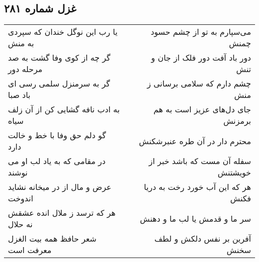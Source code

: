 \begin{center}
\section*{غزل شماره ۲۸۱}
\label{sec:sh281}
\begin{longtable}{l p{0.5cm} r}
یا رب این نوگل خندان که سپردی به منش
&&
می‌سپارم به تو از چشم حسود چمنش
\\
گر چه از کوی وفا گشت به صد مرحله دور
&&
دور باد آفت دور فلک از جان و تنش
\\
گر به سرمنزل سلمی رسی ای باد صبا
&&
چشم دارم که سلامی برسانی ز منش
\\
به ادب نافه گشایی کن از آن زلف سیاه
&&
جای دل‌های عزیز است به هم برمزنش
\\
گو دلم حق وفا با خط و خالت دارد
&&
محترم دار در آن طره عنبرشکنش
\\
در مقامی که به یاد لب او می نوشند
&&
سفله آن مست که باشد خبر از خویشتنش
\\
عرض و مال از در میخانه نشاید اندوخت
&&
هر که این آب خورد رخت به دریا فکنش
\\
هر که ترسد ز ملال انده عشقش نه حلال
&&
سر ما و قدمش یا لب ما و دهنش
\\
شعر حافظ همه بیت الغزل معرفت است
&&
آفرین بر نفس دلکش و لطف سخنش
\\
\end{longtable}
\end{center}
